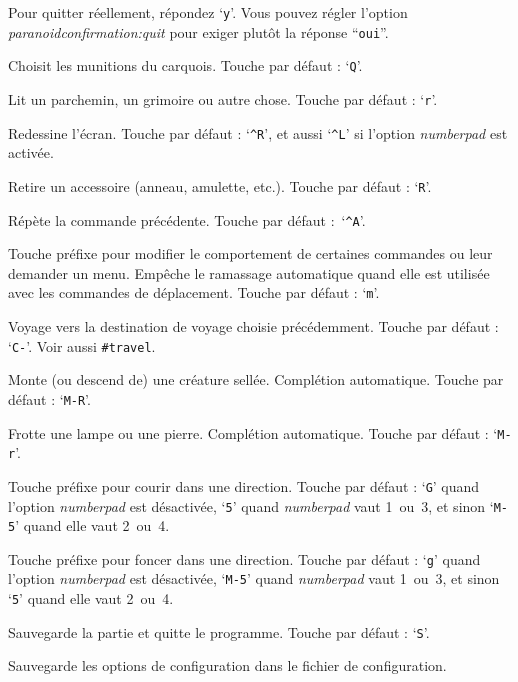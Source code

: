 \documentclass[titlepage]{article}
\begin{document}
\begin{description}[font=\mdseries\ttfamily]
Pour quitter réellement, répondez `\texttt{y}'.
Vous pouvez régler l'option
\textit{paranoid\textunderscore confirmation:quit}
pour exiger plutôt la réponse ``\texttt{oui}''.
\item[\#quiver]
Choisit les munitions du carquois. Touche par défaut : `\texttt{Q}'.
\item[\#read]
Lit un parchemin, un grimoire ou autre chose. Touche par défaut : `\texttt{r}'.
\item[\#redraw]
Redessine l'écran.
Touche par défaut : `\texttt{\textasciicircum R}',
et aussi `\texttt{\textasciicircum L}' si l'option \textit{number\textunderscore pad} est activée.
\item[\#remove]
Retire un accessoire (anneau, amulette, etc.). Touche par défaut : `\texttt{R}'.
\item[\#repeat]
Répète la commande précédente.
Touche par défaut :~`\texttt{\textasciicircum A}'.
\item[\#reqmenu]
Touche préfixe pour modifier le comportement de certaines commandes ou leur demander un menu.
Empêche le ramassage automatique quand elle est utilisée avec les commandes de déplacement.
Touche par défaut : `\texttt{m}'.
\item[\#retravel]
Voyage vers la destination de voyage choisie précédemment.
Touche par défaut : `\texttt{C-\textunderscore }'.
Voir aussi \texttt{\#travel}.
\item[\#ride]
Monte (ou descend de) une créature sellée. Complétion automatique.
Touche par défaut : `\texttt{M-R}'.
\item[\#rub]
Frotte une lampe ou une pierre. Complétion automatique. Touche par défaut : `\texttt{M-r}'.
\item[\#run]
Touche préfixe pour courir dans une direction.
Touche par défaut : `\texttt{G}' quand l'option
\textit{number\textunderscore pad}
est désactivée,
`\texttt{5}' quand
\textit{number\textunderscore pad}
vaut 1~ou~3,
et sinon `\texttt{M-5}' quand elle vaut 2~ou~4.
\item[\#rush]
Touche préfixe pour foncer dans une direction.
Touche par défaut : `\texttt{g}' quand l'option
\textit{number\textunderscore pad}
est désactivée,
`\texttt{M-5}' quand
\textit{number\textunderscore pad}
vaut 1~ou~3,
et sinon `\texttt{5}' quand elle vaut 2~ou~4.
\item[\#save]
Sauvegarde la partie et quitte le programme.
Touche par défaut : `\texttt{S}'.
\item[\#saveoptions]
Sauvegarde les options de configuration dans le fichier de configuration.

\end{description}
\end{document}
